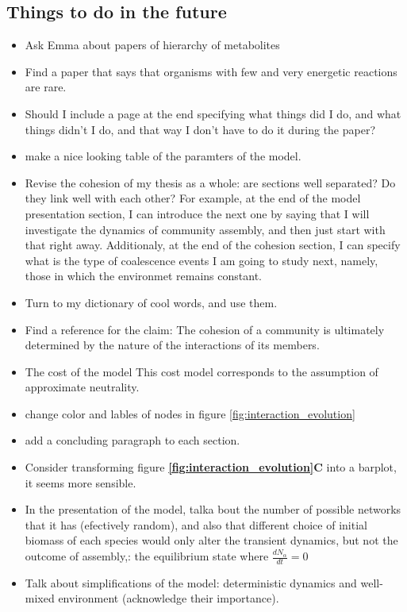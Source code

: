 \documentclass[titlepage,11pt]{article}
\begin{document}
\begin{linenumbers}
\begin{singlespace}
\section{Things to do in the future}
\begin{itemize}
	\item Ask Emma about papers of hierarchy of metabolites
	\item Find a paper that says that organisms with few and very energetic reactions are rare.
	\item Should I include a page at the end specifying what things did I do, and what things didn't I do, and that way I don't have to do it during the paper?
	\item make a nice looking table of the paramters of the model.
	\item Revise the cohesion of my thesis as a whole: are sections well separated? Do they link well with each other? For example, at the end of the model presentation section, I can introduce the next one by saying that I will investigate the dynamics of community assembly, and then just start with that right away. Additionaly, at the end of the cohesion section, I can specify what is the type of coalescence events I am going to study next, namely, those in which the environmet remains constant.
	\item Turn to my dictionary of cool words, and use them.
	\item Find a reference for the claim: The cohesion of a community is ultimately determined by the nature of the interactions of its members.
	\item The cost of the model This cost model corresponds to the assumption of approximate neutrality.
	\item change color and lables of nodes in figure \ref{fig:interaction_evolution}
	\item add a concluding paragraph to each section.
	\item Consider transforming figure \textbf{\ref{fig:interaction_evolution}C} into a barplot, it seems more sensible.
	\item In the presentation of the model, talka bout the number of possible networks that it has (efectively random), and also that different choice of initial biomass of each species would only alter the transient dynamics, but not the outcome of assembly,: the equilibrium state where $ \frac{dN_{\alpha}}{dt} = 0 $
	\item Talk about simplifications of the model: deterministic dynamics and well-mixed environment (acknowledge their importance).

\end{itemize}
\end{singlespace}
\end{linenumbers}
\end{document}
